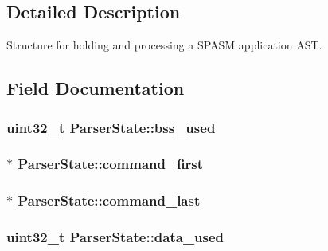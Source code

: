 \subsection{\-Detailed \-Description}
\-Structure for holding and processing a \-S\-P\-A\-S\-M application \-A\-S\-T. 

\subsection{\-Field \-Documentation}
\hypertarget{struct_parser_state_ac10c4556abd95773deb418ef3b26fab8}{
\subsubsection[{bss\-\_\-used}]{\setlength{\rightskip}{0pt plus 5cm}uint32\-\_\-t {\bf \-Parser\-State\-::bss\-\_\-used}}}\label{struct_parser_state_ac10c4556abd95773deb418ef3b26fab8}
\hypertarget{struct_parser_state_a23889d26f95df19cf4fad8ca001a343f}{
\subsubsection[{command\-\_\-first}]{$\ast$ {\bf \-Parser\-State\-::command\-\_\-first}}}\label{struct_parser_state_a23889d26f95df19cf4fad8ca001a343f}
\hypertarget{struct_parser_state_abdb676c62455b934215960211eedc209}{
\subsubsection[{command\-\_\-last}]{$\ast$ {\bf \-Parser\-State\-::command\-\_\-last}}}\label{struct_parser_state_abdb676c62455b934215960211eedc209}
\hypertarget{struct_parser_state_a228f3fe68f7d2f6b722f8ab6d2d6546a}{
\subsubsection[{data\-\_\-used}]{\setlength{\rightskip}{0pt plus 5cm}uint32\-\_\-t {\bf \-Parser\-State\-::data\-\_\-used}}}\label{struct_parser_state_a228f3fe68f7d2f6b722f8ab6d2d6546a}
